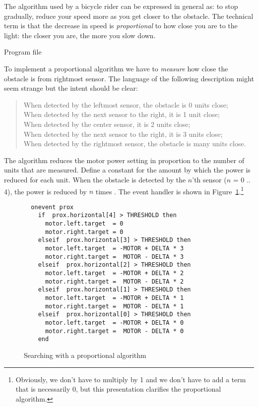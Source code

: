 The algorithm used by a bicycle rider can be expressed in general as: to
stop gradually, reduce your speed more as you get closer to the
obstacle. The technical term is that the decrease in speed is
\emph{proportional} to how close you are to the light: the closer you
are, the more you slow down.

{\raggedleft \hfill Program file }

To implement a proportional algorithm we have to \emph{measure} how
close the obstacle is from rightmost sensor. The language of the
following description might seem strange but the intent should be clear:

\begin{quote}
When detected by the leftmost sensor, the obstacle is 0 units close;\\
When detected by the next sensor to the right, it is 1 unit close;\\
When detected by the center sensor, it is 2 units close;\\
When detected by the next sensor to the right, it is 3 units close;\\
When detected by the rightmost sensor, the obstacle is many units close.
\end{quote}

The algorithm reduces the motor power setting in proportion to the
number of units that are measured. Define a constant  for the
amount by which the power is reduced for each unit. When the obstacle is
detected by the $n$'th sensor ($n$ = 0 .. 4), the power is reduced by
$n$ times . The event handler is shown in
Figure~\ref{f.pro}.\footnote{Obviously, we don't have to multiply
 by 1 and we don't have to add a term that is necessarily 0,
but this presentation clarifies the proportional algorithm.}

\begin{figure}
\begin{verbatim}
  onevent prox
    if  prox.horizontal[4] > THRESHOLD then
      motor.left.target  = 0
      motor.right.target = 0
    elseif  prox.horizontal[3] > THRESHOLD then
      motor.left.target  = -MOTOR + DELTA * 3
      motor.right.target =  MOTOR - DELTA * 3
    elseif  prox.horizontal[2] > THRESHOLD then
      motor.left.target  = -MOTOR + DELTA * 2
      motor.right.target =  MOTOR - DELTA * 2
    elseif  prox.horizontal[1] > THRESHOLD then
      motor.left.target  = -MOTOR + DELTA * 1
      motor.right.target =  MOTOR - DELTA * 1
    elseif  prox.horizontal[0] > THRESHOLD then
      motor.left.target  = -MOTOR + DELTA * 0
      motor.right.target =  MOTOR - DELTA * 0
    end
\end{verbatim}
\caption{Searching with a proportional algorithm}\label{f.pro}
\end{figure}

